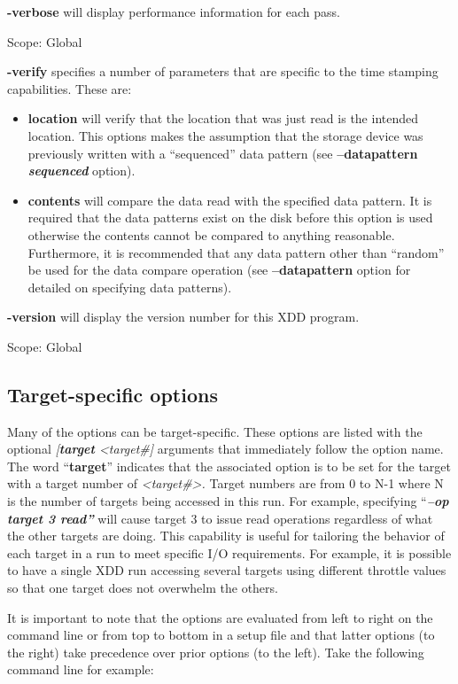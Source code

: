 \textbf{-verbose} will display performance information for each pass.

Scope: Global

\textbf{-verify} specifies a number of parameters that are specific to the time stamping capabilities. These are:

\begin{itemize}
\item
  \textbf{location} will verify that the location that was just read is the intended location. This options makes the assumption that the storage device was previously written with a ``sequenced'' data pattern (see \textbf{--datapattern \emph{sequenced}} option).
\item
  \textbf{contents} will compare the data read with the specified data pattern. It is required that the data patterns exist on the disk before this option is used otherwise the contents cannot be compared to anything reasonable. Furthermore, it is recommended that any data pattern other than ``random'' be used for the data compare operation (see \textbf{--datapattern} option for detailed on specifying data patterns).
\end{itemize}

\textbf{-version} will display the version number for this XDD program.

Scope: Global

\subsection{Target-specific options}\label{target-specific-options}

Many of the options can be target-specific. These options are listed with the optional \emph{{[}\textbf{target} \textless target\#{]}} arguments that immediately follow the option name. The word ``\textbf{target}'' indicates that the associated option is to be set for the target with a target number of \emph{\textless target\#\textgreater.} Target numbers are from 0 to N-1 where N is the number of targets being accessed in this run. For example, specifying ``\emph{\textbf{--op target 3 read''}} will cause target 3 to issue read operations regardless of what the other targets are doing. This capability is useful for tailoring the behavior of each target in a run to meet specific I/O requirements. For example, it is possible to have a single XDD run accessing several targets using different throttle values so that one target does not overwhelm the others.

It is important to note that the options are evaluated from left to right on the command line or from top to bottom in a setup file and that latter options (to the right) take precedence over prior options (to the left). Take the following command line for example:

